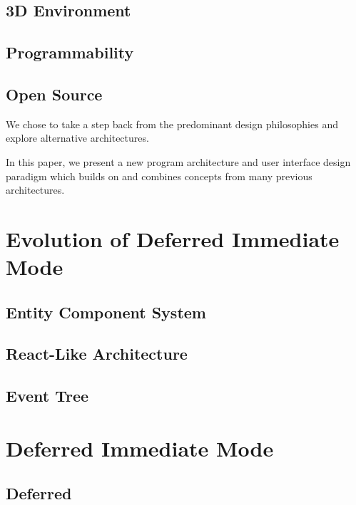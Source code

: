 \documentclass[conference,12pt]{IEEEtran}
\begin{document}
\subsection{3D Environment}

\subsection{Programmability}

\subsection{Open Source}

We chose to take a step back from the predominant design philosophies and
explore alternative architectures.

In this paper, we present a new program architecture and user interface design
paradigm which builds on and combines concepts from many previous architectures.

\section{Evolution of Deferred Immediate Mode}

\subsection{Entity Component System}

\subsection{React-Like Architecture}

\subsection{Event Tree}

\section{Deferred Immediate Mode}

\subsection{Deferred}
\end{document}

